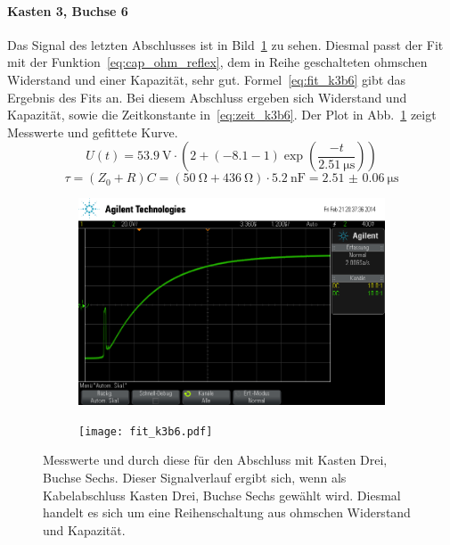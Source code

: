 \paragraph{Kasten 3, Buchse 6}
Das Signal des letzten Abschlusses ist in Bild~\ref{fig:k3b6} zu sehen.
Diesmal passt der Fit mit der Funktion~\eqref{eq:cap_ohm_reflex}, dem in
Reihe geschalteten ohmschen Widerstand und einer Kapazität, sehr gut.
Formel~\eqref{eq:fit_k3b6} gibt das Ergebnis des Fits an.  Bei diesem
Abschluss ergeben sich Widerstand und Kapazität, sowie die 
Zeitkonstante in~\eqref{eq:zeit_k3b6}. Der  Plot
in Abb.~\ref{fig:k3b6} zeigt Messwerte und gefittete Kurve.
%
\begin{equation}
  U(t) = \SI{53.9}{\volt}\cdot\left(2 + 
    \left(-8.1 - 1\right)\exp{\left(\frac{-t}
{\SI{2.51}{\micro\second}}\right)}\right)
  \label{eq:fit_k3b6}
\end{equation}
%
\begin{equation}
  \tau = (Z_0 + R)C = 
(\SI{50}{\ohm}+\SI{436}{\ohm})\cdot\SI{5.2}{\nano\farad}= 
\SI{2.51(6)}{\micro\second}
  \label{eq:zeit_k3b6}
\end{equation}
%
\begin{figure}[]
  \centering

  \begin{subfigure}{0.45\textwidth}
    \includegraphics[width=\textwidth]{k3b6.png}
  \end{subfigure}
  \quad
  \begin{subfigure}{0.45\textwidth}
    \texttt{[image: fit\_k3b6.pdf]}
  \end{subfigure}

  \caption{Messwerte und durch diese für den Abschluss mit Kasten Drei,
    Buchse Sechs.  Dieser Signalverlauf ergibt sich, wenn als
    Kabelabschluss Kasten Drei, Buchse Sechs gewählt wird. Diesmal
    handelt es sich um eine Reihenschaltung aus ohmschen Widerstand und
    Kapazität.}
  \label{fig:k3b6}
\end{figure}
%